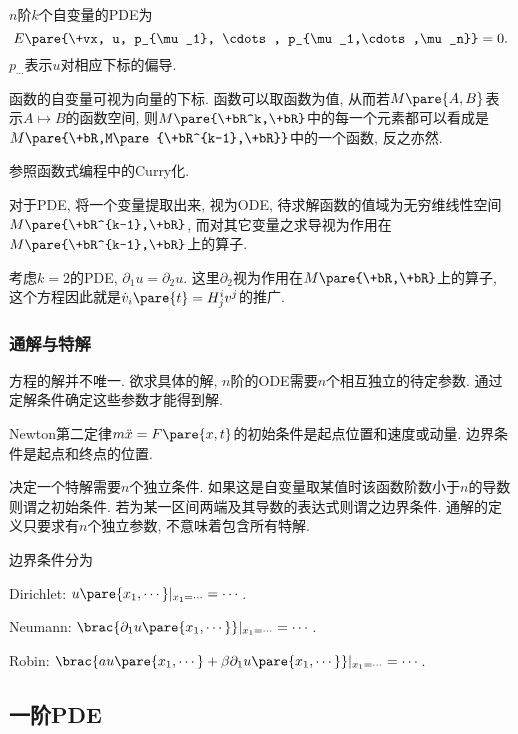 \documentclass[hidelinks]{ctexart}
\begin{document}
$n$阶$k$个自变量的PDE为
\[ E\pare{\+vx, u, p_{\mu_1}, \cdots, p_{\mu_1,\cdots,\mu_n}} = 0. \]
$p_{\cdots}$表示$u$对相应下标的偏导.
\par
函数的自变量可视为向量的下标. 函数可以取函数为值, 从而若$M\pare{A,B}$表示$A\mapsto B$的函数空间, 则$M\pare{\+bR^k,\+bR}$中的每一个元素都可以看成是$M\pare{\+bR,M\pare{\+bR^{k-1},\+bR}}$中的一个函数, 反之亦然.
\begin{remark}
    参照函数式编程中的Curry化.
\end{remark}
对于PDE, 将一个变量提取出来, 视为ODE, 待求解函数的值域为无穷维线性空间$M\pare{\+bR^{k-1},\+bR}$, 而对其它变量之求导视为作用在$M\pare{\+bR^{k-1},\+bR}$上的算子.
\begin{ex}
    考虑$k=2$的PDE, $\partial_1 u = \partial_2 u$. 这里$\partial_2$视为作用在$M\pare{\+bR,\+bR}$上的算子, 这个方程因此就是$\dot{v}_i\pare{t} = H_j^i v^j$的推广.
\end{ex}


\subsubsection{通解与特解} %
\label{ssub:通解与特解}

方程的解并不唯一. 欲求具体的解, $n$阶的ODE需要$n$个相互独立的待定参数. 通过定解条件确定这些参数才能得到解.
\begin{ex}
    Newton第二定律$m\ddot{x} = F\pare{x,t}$的初始条件是起点位置和速度或动量. 边界条件是起点和终点的位置.
\end{ex}
决定一个特解需要$n$个独立条件. 如果这是自变量取某值时该函数阶数小于$n$的导数则谓之初始条件. 若为某一区间两端及其导数的表达式则谓之边界条件. 通解的定义只要求有$n$个独立参数, 不意味着包含所有特解.
\par
边界条件分为
\begin{cenum}
    \item Dirichlet: $u\pare{x_1,\cdots}\vert_{x_1=\cdots} = \cdots$.
    \item Neumann: $\brac{\partial_1 u\pare{x_1,\cdots}}\vert_{x_1=\cdots} = \cdots$.
    \item Robin: $\brac{au\pare{x_1,\cdots} + \beta \partial_1 u\pare{x_1,\cdots}}\vert_{x_1= \cdots} = \cdots$.
\end{cenum}



\subsection{一阶PDE} %
\label{sub:一阶pde}
\end{document}
